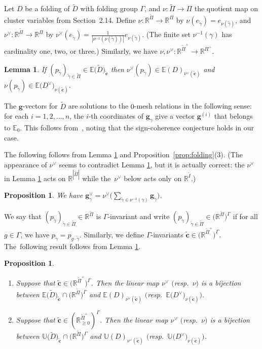 \documentclass[pdftex]{sigma}%
\def\R{{\mathbb R}}
\def\E{{\mathbb E}}
\def\U{{\mathbb U}}
\def\tD{{\tilde D}}
\def\tc{{\tilde \c}}
\def\tI{{\tilde I}}
\def\g{{\mathbf g}}
\def\tgamma{{\tilde \gamma}}
\def\tPi{{\tilde \Pi}}
\def\c{{\mathbf c}}
\numberwithin{equation}{section}
\newtheorem{Lemma}[Theorem]{Lemma}
\newtheorem{Proposition}[Theorem]{Proposition}
\begin{document}
Let $D$ be a folding of $\tD$ with folding group $\Gamma$, and $\nu\colon \tPi \to \Pi$ the quotient map on cluster variables from Section~2.14. Define $\nu\colon \R^{\tPi} \to \R^{\Pi}$ by $\nu(e_\tgamma) = e_{\nu(\tgamma)}$, and $\nu^\vee\colon \R^{\tPi} \to \R^{\Pi}$ by $\nu^\vee(e_\tgamma) = \frac{1}{|\nu^{-1}(\nu(\tgamma))|}e_{\nu(\tgamma)}$. (The finite set $\nu^{-1}(\gamma)$ has cardinality one, two, or three.) Similarly, we have $\nu,\nu^\vee\colon \R^{\tPi^+} \to \R^{\Pi^+}$.

\begin{Lemma}\label{lem:fold}
If $(p_{\tgamma})_{\tgamma \in \tPi} \in \E\big(\tD\big)_{\tc}$ then $\nu^\vee(p_{\tgamma}) \in \E(D)_{\nu^\vee(\tc)}$ and $\nu(p_{\tgamma}) \in \E\big(D^\vee\big)_{\nu(\tc)}$.
\end{Lemma}

The $\g$-vectors for $\tD$ are solutions to the $0$-mesh relations in the following sense: for each $i =1,2,\dots,n$, the $i$-th coordinates of $\g_\gamma$ give a vector $\g^{(i)}$ that belongs to $\E_0$. This follows from~\cite[relation~(6.13)]{CA4}, noting that the sign-coherence conjecture \cite[Conjecture~6.13]{CA4} holds in our case.

The following follows from Lemma \ref{lem:fold} and Proposition~\ref{prop:folding}(3). (The appearance of $\nu^\vee$ seems to contradict Lemma \ref{lem:fold}, but it is actually correct: the $\nu^\vee$ in Lemma \ref{lem:fold} acts on $\R^{|\tPi|}$ while the~$\nu^\vee$ below acts only on $\R^{\tI}$.)
\begin{Proposition}\label{prop:gvee}
We have $\g^\vee_\gamma = \nu^\vee\Big( \sum_{\tgamma \in \nu^{-1}(\gamma)}\g_\tgamma\Big)$.
\end{Proposition}

We say that $(p_{\tgamma})_{\tgamma \in \tPi} \in \R^{\tPi}$ is $\Gamma$-invariant and write $(p_{\tgamma})_{\tgamma \in \tPi} \in \big(\R^{\tPi}\big)^\Gamma$ if for all $g \in \Gamma$, we have $p_{\tgamma} = p_{g \cdot \tgamma}$. Similarly, we define $\Gamma$-invariants $\tc \in \big(\R^{\tPi^+}\big)^\Gamma$. The~following result follows from Lemma \ref{lem:fold}.

\begin{Proposition}\label{prop:bijfold} \
\begin{enumerate}\itemsep=0pt
\item[$1.$]
Suppose that $\tc \in \big(\R^{\tPi^+}\big)^\Gamma$.
Then the linear map $\nu^\vee$ $($resp.\ $\nu)$ is a bijection between $\E\big(\tD\big)_{\tc} \cap \big(\R^{\tPi}\big)^\Gamma$ and $\E(D)_{\nu^\vee(\tc)}$ $\big($resp.\ $\E\big(D^\vee\big)_{\nu(\tc)}\big)$.
\item[$2.$]
Suppose that $\tc \in (\R_{\geq 0}^{\tPi^+})^\Gamma$.
Then the linear map $\nu^\vee$ $($resp.\ $\nu)$ is a bijection between $\U\big(\tD\big)_{\tc} \cap \big(\R^{\tPi}\big)^\Gamma$ and $\U(D)_{\nu^\vee(\tc)}$ $\big($resp.\ $\U\big(D^\vee\big)_{\nu(\tc)}\big)$.
\end{enumerate}
\end{Proposition}
\end{document}
